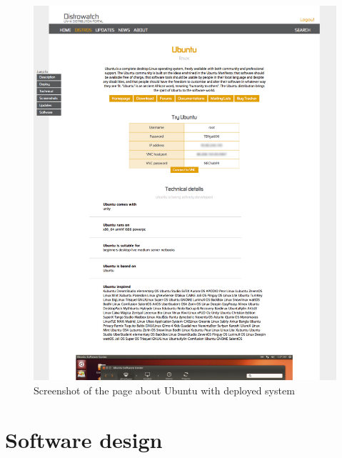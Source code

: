 \documentclass[thesis=B,english]{FITthesis}[2013/04/26]
\begin{document}
\begin{center}
\begin{figure}[overhang]
	\advance\leftskip-0.75cm
	\includegraphics[width=430pt]{images/screen_ubuntu.pdf}
	\caption{Screenshot of the page about Ubuntu with deployed system}
	\label{fig: tndw-screens}
\end{figure}
\end{center}

\chapter{Software design}
\end{document}
